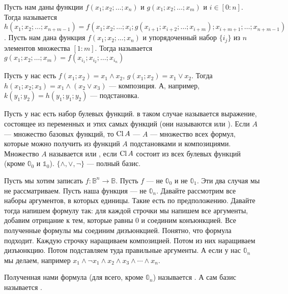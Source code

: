\documentclass{article}
\begin{document}
\begin{itemize}
\begin{Comment}
        \end{Comment}
        \dfn Пусть нам даны функции $f(x_1;x_2;\ldots;x_n)$ и $g(x_1;x_2;\ldots;x_m)$ и $i\in[0:n]$. Тогда  называется $h(x_1;x_2;\ldots;x_{n+m-1})=f(x_1;x_2;\ldots;x_i;g(x_{i+1};x_{i+2};\ldots;x_{i+m});x_{i+m+1};\ldots;x_{n+m-1})$.
        \dfn Пусть нам дана функция $f(x_1;x_2;\ldots;x_n)$ и упорядоченный набор $\{i_j\}$ из $n$ элементов множества $[1:m]$. Тогда  называется $g(x_1;x_2;\ldots;x_m)=f(x_{i_1};x_{i_2};\ldots;x_{i_n})$
        \begin{Example}
            Пусть у нас есть $f(x_1;x_2)=x_1\land x_2$, $g(x_1;x_2)=x_1\lor x_2$. Тогда $h(x_1;x_2;x_3)=x_1\land(x_2\lor x_3)$ --- композиция. А, например, $k(y_1;y_2)=h(y_1;y_1;y_2)$ --- подстановка.
        \end{Example}
        \dfn Пусть у нас есть набор булевых функций.  в таком случае называется выражение, состоящее из переменных и этих самых функций (они называются  или ).
        \dfn Если $A$ --- множество базовых функций, то $\operatorname{Cl} A$ ---  $A$ --- множество всех формул, которые можно получить из функций $A$ подстановками и композициями.
        \dfn Множество $A$ называется  или , если $\operatorname{Cl} A$ состоит из всех булевых функций (кроме $\mathbb0_0$ и $\mathbb1_0$).
        \thm $\{\land,\lor,\neg\}$ --- полный базис.
        \begin{Proof}
            Пусть мы хотим записать $f\colon\mathbb B^n\to\mathbb B$. Пусть $f$ --- не $\mathbb0_0$ и не $\mathbb0_1$. Эти два случая мы не рассматриваем. Пусть наша функция --- не $\mathbb0_n$. Давайте рассмотрим все наборы аргументов, в которых единицы. Такие есть по предположению. Давайте тогда напишем формулу так: для каждой строчки мы напишем все аргументы, добавим отрицание к тем, которые равны 0 и соединим конъюнкцией. Все полученные формулы мы соединим дизъюнкцией. Понятно, что формула подходит. Каждую строчку наращиваем композицией. Потом из них наращиваем дизъюнкцию. Потом подставляем туда правильные аргументы. А если у нас $\mathbb0_n$ мы делаем, например $x_1\land\neg x_1\land x_2\land x_3\land\cdots\land x_n$.
        \end{Proof}
        \dfn Полученная нами формула (для всего, кроме $\mathbb0_n$) называется .
        \dfn А сам базис называется .

\end{itemize}
\end{document}
